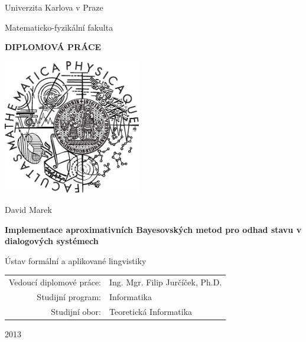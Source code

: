 \documentclass[12pt,a4paper]{report}
\begin{document}



\pagestyle{empty}
\begin{center}

\large

Univerzita Karlova v Praze

\medskip

Matematicko-fyzikální fakulta

\vfill

{\bf\Large DIPLOMOVÁ PRÁCE}

\vfill

\centerline{\mbox{\includegraphics[width=60mm]{../img/logo.eps}}}

\vfill
\vspace{5mm}

{\LARGE David Marek}

\vspace{15mm}

{\LARGE\bfseries Implementace aproximativních Bayesovských metod pro odhad stavu v dialogových systémech}

\vfill

Ústav formální a aplikované lingvistiky

\vfill

\begin{tabular}{rl}

Vedoucí diplomové práce: & Ing. Mgr. Filip Jurčíček, Ph.D. \\
\noalign{\vspace{2mm}}
Studijní program: & Informatika \\
\noalign{\vspace{2mm}}
Studijní obor: & Teoretická Informatika \\
\end{tabular}

\vfill

2013

\end{center}
\end{document}

